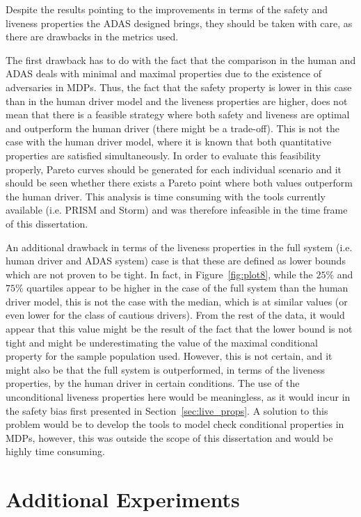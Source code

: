 Despite the results pointing to the improvements in terms of the safety and liveness properties the ADAS designed brings, they should be taken with care, as there are drawbacks in the metrics used. 

The first drawback has to do with the fact that the comparison in the human and ADAS deals with minimal and maximal properties due to the existence of adversaries in MDPs. Thus, the fact that the safety property is lower in this case than in the human driver model and the liveness properties are higher, does not mean that there is a feasible strategy where both safety and liveness are optimal and outperform the human driver (there might be a trade-off). This is not the case with the human driver model, where it is known that both quantitative properties are satisfied simultaneously. In order to evaluate this feasibility properly, Pareto curves should be generated for each individual scenario and it should be seen whether there exists a Pareto point where both values outperform the human driver. This analysis is time consuming with the tools currently available (i.e. PRISM and Storm) and was therefore infeasible in the time frame of this dissertation. 

An additional drawback in terms of the liveness properties in the full system (i.e. human driver and ADAS system) case is that these are defined as lower bounds which are not proven to be tight. In fact, in Figure~\ref{fig:plot8}, while the $25\%$ and $75\%$ quartiles appear to be higher in the case of the full system than the human driver model, this is not the case with the median, which is at similar values (or even lower for the class of cautious drivers). From the rest of the data, it would appear that this value might be the result of the fact that the lower bound is not tight and might be underestimating the value of the maximal conditional property for the sample population used. However, this is not certain, and it might also be that the full system is outperformed, in terms of the liveness properties, by the human driver in certain conditions. The use of the unconditional liveness properties here would be meaningless, as it would incur in the safety bias first presented in Section~\ref{sec:live_props}. A solution to this problem would be to develop the tools to model check conditional properties in MDPs, however, this was outside the scope of this dissertation and would be highly time consuming.

\section{Additional Experiments}
\label{sec:add_exp}

